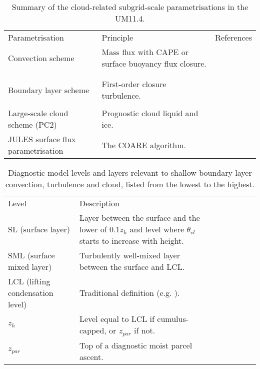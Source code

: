 \clearpage

\begin{table}
\caption{
Summary of the cloud-related subgrid-scale parametrisations in the UM11.4.
}
\label{tab:parametrisations}
\begin{tabular}{lll}
Parametrisation & Principle & References\\
Convection scheme & Mass flux with CAPE or surface buoyancy flux closure. & \cite{gregory1990}\\
& & \cite{grant1999}\\
& & \cite{grant2001}\\
Boundary layer scheme & First-order closure turbulence. &\cite{lock2000}\\
& & \cite{martin2000}\\
Large-scale cloud scheme (PC2) & Prognostic cloud liquid and ice. & \cite{wilson2008a,wilson2008b}\\
JULES surface flux parametrisation & The COARE algorithm. & \cite{fairall2003}\\
\end{tabular}
\end{table}

\begin{table}
\caption{
Diagnostic model levels and layers relevant to shallow boundary layer convection, turbulence
and cloud, listed from the lowest to the highest.
}
\label{tab:levels}
\begin{tabular}{llllllll}
Level & Description\\
SL (surface layer) & Layer between the surface and the lower of 0.1$z_h$ and level where $\theta_{vl}$ starts to increase with height.\\
SML (surface mixed layer) & Turbulently well-mixed layer between the surface and LCL.\\
LCL (lifting condensation level) & Traditional definition (e.g. \cite{wallace2006}).\\
$z_h$ & Level equal to LCL if cumulus-capped, or $z_{par}$ if not.\\
$z_{par}$ & Top of a diagnostic moist parcel ascent.\\
\end{tabular}
\end{table}

